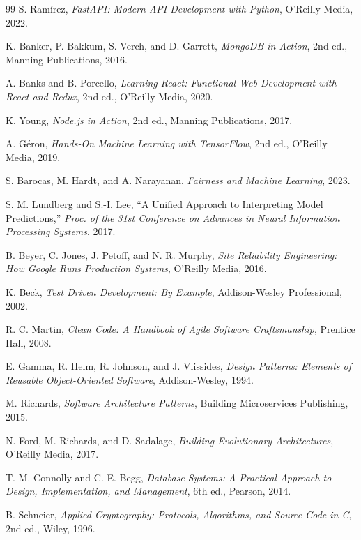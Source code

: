 \documentclass[12pt,a4paper]{report}
\begin{document}
\begin{itemize}
\begin{thebibliography}{99}
 S. Ram\'irez, \textit{FastAPI: Modern API Development with Python}, O'Reilly Media, 2022.

 K. Banker, P. Bakkum, S. Verch, and D. Garrett, \textit{MongoDB in Action}, 2nd ed., Manning Publications, 2016.

 A. Banks and B. Porcello, \textit{Learning React: Functional Web Development with React and Redux}, 2nd ed., O'Reilly Media, 2020.

 K. Young, \textit{Node.js in Action}, 2nd ed., Manning Publications, 2017.

 A. Géron, \textit{Hands-On Machine Learning with TensorFlow}, 2nd ed., O'Reilly Media, 2019.

 S. Barocas, M. Hardt, and A. Narayanan, \textit{Fairness and Machine Learning}, 2023.

 S. M. Lundberg and S.-I. Lee, ``A Unified Approach to Interpreting Model Predictions,'' \textit{Proc. of the 31st Conference on Advances in Neural Information Processing Systems}, 2017.

 B. Beyer, C. Jones, J. Petoff, and N. R. Murphy, \textit{Site Reliability Engineering: How Google Runs Production Systems}, O'Reilly Media, 2016.

 K. Beck, \textit{Test Driven Development: By Example}, Addison-Wesley Professional, 2002.

 R. C. Martin, \textit{Clean Code: A Handbook of Agile Software Craftsmanship}, Prentice Hall, 2008.

 E. Gamma, R. Helm, R. Johnson, and J. Vlissides, \textit{Design Patterns: Elements of Reusable Object-Oriented Software}, Addison-Wesley, 1994.

 M. Richards, \textit{Software Architecture Patterns}, Building Microservices Publishing, 2015.

 N. Ford, M. Richards, and D. Sadalage, \textit{Building Evolutionary Architectures}, O'Reilly Media, 2017.

 T. M. Connolly and C. E. Begg, \textit{Database Systems: A Practical Approach to Design, Implementation, and Management}, 6th ed., Pearson, 2014.

 B. Schneier, \textit{Applied Cryptography: Protocols, Algorithms, and Source Code in C}, 2nd ed., Wiley, 1996.


\end{thebibliography}
\end{itemize}
\end{document}
